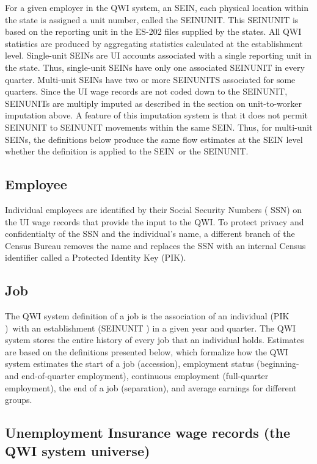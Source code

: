 For a given employer in the QWI system, an SEIN, each physical location
within the state is assigned a unit number, called the SEINUNIT. This
SEINUNIT is based on the reporting unit in the ES-202 files supplied by the
states. All QWI statistics are produced by aggregating statistics calculated
at the establishment level. Single-unit SEINs are UI accounts associated
with a single reporting unit in the state. Thus, single-unit SEINs have only
one associated SEINUNIT in every quarter. Multi-unit SEINs have two or more
SEINUNITS associated for some quarters. Since the UI wage records are not
coded down to the SEINUNIT, SEINUNITs are multiply imputed as described in
the section on unit-to-worker imputation above. A feature of this imputation
system is that it does not permit SEINUNIT to SEINUNIT movements within the
same SEIN. Thus, for multi-unit SEINs, the definitions below produce the
same flow estimates at the SEIN level whether the definition is applied to
the SEIN\ or the SEINUNIT.

\subsection{Employee}

Individual employees are identified by their Social Security Numbers (%
SSN) on the UI wage records that provide the input to the QWI. To
protect privacy and confidentialty of the SSN and the individual's
name, a different branch of the Census Bureau removes the name and replaces
the SSN with an internal Census identifier called a Protected
Identity Key (PIK).

\subsection{Job}

The QWI system definition of a job is the association of an individual (PIK%
)\ with an establishment (SEINUNIT 
) in a given year and quarter. The QWI system stores the
entire history of every job that an individual holds. Estimates are based on
the definitions presented below, which formalize how the QWI system
estimates the start of a job (accession), employment status (beginning- and
end-of-quarter employment), continuous employment (full-quarter employment),
the end of a job (separation), and average earnings for different groups.

\subsection{Unemployment Insurance wage records (the QWI system universe)}

